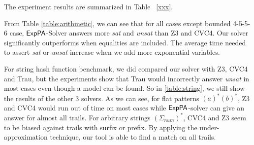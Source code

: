 The experiment results are summarized in Table ~\ref{xxx}. 





From Table \ref{table:arithmetic}, we can see that for all cases except bounded 4-5-5-6 case, ${\sf ExpPA}$-Solver answers more \textit{sat} and \textit{unsat} than Z3 and CVC4. Our solver significantly outperforms when equalities are included. The average time needed to assert \textit{sat} or \textit{unsat} increase when we add more exponential variables.


For string hash function benchmark, we did compared our solver with Z3, CVC4 and Trau, but the experiments show that Trau would incorrectly answer \textit{unsat} in most cases even though a model can be found. So in \ref{table:string}, we still show the results of the other 3 solvers. As we can see, for flat patterns $(a)^*(b)^*$, Z3 and CVC4 would run out of time on most cases while ${\sf ExpPA}$-solver can give an answer for almost all trails. For arbitrary strings $(\Sigma_{num})^*$, CVC4 and Z3 seem to be biased against trails with surfix or prefix. By applying the under-approximation technique, our tool is able to find a match on all trails. 


